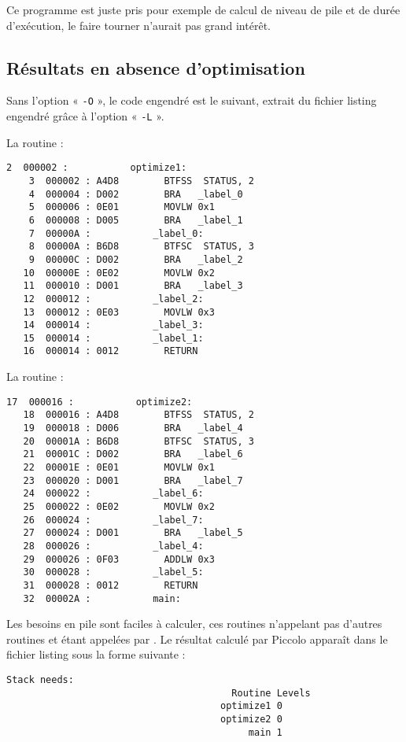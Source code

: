 Ce programme est juste pris pour exemple de calcul de niveau de pile et de durée d'exécution, le faire tourner n'aurait pas grand intérêt.

\subsection{Résultats en absence d'optimisation}

Sans l'option « \texttt{-O} », le code engendré est le suivant, extrait du fichier listing engendré grâce à l'option « \texttt{-L} ».

La routine  :

\begin{lstlisting}[language=assembleur, frame=l]
    2  000002 :           optimize1:
    3  000002 : A4D8        BTFSS  STATUS, 2
    4  000004 : D002        BRA   _label_0
    5  000006 : 0E01        MOVLW 0x1
    6  000008 : D005        BRA   _label_1
    7  00000A :           _label_0:
    8  00000A : B6D8        BTFSC  STATUS, 3
    9  00000C : D002        BRA   _label_2
   10  00000E : 0E02        MOVLW 0x2
   11  000010 : D001        BRA   _label_3
   12  000012 :           _label_2:
   13  000012 : 0E03        MOVLW 0x3
   14  000014 :           _label_3:
   15  000014 :           _label_1:
   16  000014 : 0012        RETURN
\end{lstlisting}

La routine  :

\begin{lstlisting}[language=assembleur, frame=l]
   17  000016 :           optimize2:
   18  000016 : A4D8        BTFSS  STATUS, 2
   19  000018 : D006        BRA   _label_4
   20  00001A : B6D8        BTFSC  STATUS, 3
   21  00001C : D002        BRA   _label_6
   22  00001E : 0E01        MOVLW 0x1
   23  000020 : D001        BRA   _label_7
   24  000022 :           _label_6:
   25  000022 : 0E02        MOVLW 0x2
   26  000024 :           _label_7:
   27  000024 : D001        BRA   _label_5
   28  000026 :           _label_4:
   29  000026 : 0F03        ADDLW 0x3
   30  000028 :           _label_5:
   31  000028 : 0012        RETURN
   32  00002A :           main:
\end{lstlisting}

Les besoins en pile sont faciles à calculer, ces routines n'appelant pas d'autres routines et étant appelées par . Le résultat calculé par Piccolo apparaît dans le fichier listing sous la forme suivante :
\begin{lstlisting}[language=assembleur, frame=l]
Stack needs:
                                        Routine Levels
                                      optimize1 0
                                      optimize2 0
                                           main 1
\end{lstlisting}

